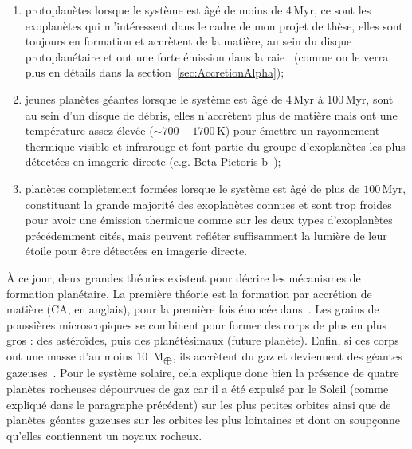 \begin{enumerate}
    \item protoplanètes lorsque le système est âgé de moins de $4 \,$Myr, ce sont les exoplanètes qui m'intéressent dans le cadre de mon projet de thèse, elles sont toujours en formation et accrètent de la matière, au sein du disque protoplanétaire et ont une forte émission dans la raie \ha~(comme on le verra plus en détails dans la section~\ref{sec:AccretionAlpha});
    \item jeunes planètes géantes lorsque le système est âgé de $4 \,$Myr à $100 \,$Myr, sont au sein d'un disque de débris, elles n'accrètent plus de matière mais ont une température assez élevée ($\sim 700 - 1700 \,$K) pour émettre un rayonnement thermique visible et infrarouge et font partie du groupe d'exoplanètes les plus détectées en imagerie directe (e.g. Beta Pictoris b~\citep{lagrange2010});
    \item planètes complètement formées lorsque le système est âgé de plus de $100 \,$Myr, constituant la grande majorité des exoplanètes connues et sont trop froides pour avoir une émission thermique comme sur les deux types d'exoplanètes précédemment cités, mais peuvent refléter suffisamment la lumière de leur étoile pour être détectées en imagerie directe.
\end{enumerate}

À ce jour, deux grandes théories existent pour décrire les mécanismes de formation planétaire. La première théorie est la formation par accrétion de matière (\ac{CA}, en anglais), pour la première fois énoncée dans~\cite{safronov1972}. Les grains de poussières microscopiques se combinent pour former des corps de plus en plus gros : des astéroïdes, puis des planétésimaux (future planète). Enfin, si ces corps ont une masse d'au moins $10 \,$ M$_{\bigoplus}$, ils accrètent du gaz et deviennent des géantes gazeuses~\citep{pollack1996}. Pour le système solaire, cela explique donc bien la présence de quatre planètes rocheuses dépourvues de gaz car il a été expulsé par le Soleil (comme expliqué dans le paragraphe précédent) sur les plus petites orbites ainsi que de planètes géantes gazeuses sur les orbites les plus lointaines et dont on soupçonne qu'elles contiennent un noyaux rocheux.

